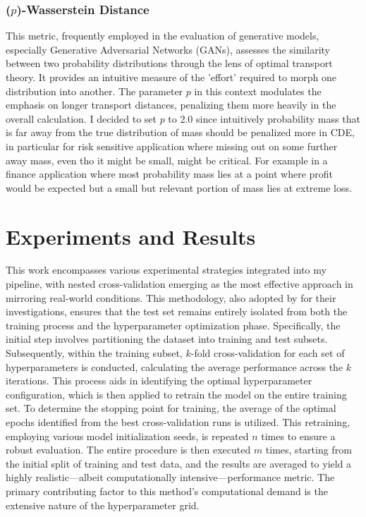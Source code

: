 \documentclass{article}
\begin{document}
\subsubsection{($p$)-Wasserstein Distance}
This metric, frequently employed in the evaluation of generative models, especially Generative Adversarial Networks (GANs), assesses the similarity between two probability distributions through the lens of optimal transport theory. It provides an intuitive measure of the 'effort' required to morph one distribution into another. The parameter $p$ in this context modulates the emphasis on longer transport distances, penalizing them more heavily in the overall calculation. I decided to set $p$ to 2.0 since intuitively probability mass that is far away from the true distribution of mass should be penalized more in CDE, in particular for risk sensitive application where missing out on some further away mass, even tho it might be small, might be critical. For example in a finance application where most probability mass lies at a point where profit would be expected but a small but relevant portion of mass lies at extreme loss.

\section{Experiments and Results}\label{sec:experiments_and_results}
This work encompasses various experimental strategies integrated into my pipeline, with nested cross-validation emerging as the most effective approach in mirroring real-world conditions. This methodology, also adopted by \citep{rothfuss2019noise} for their investigations, ensures that the test set remains entirely isolated from both the training process and the hyperparameter optimization phase. Specifically, the initial step involves partitioning the dataset into training and test subsets. Subsequently, within the training subset, $k$-fold cross-validation for each set of hyperparameters is conducted, calculating the average performance across the $k$ iterations. This process aids in identifying the optimal hyperparameter configuration, which is then applied to retrain the model on the entire training set. To determine the stopping point for training, the average of the optimal epochs identified from the best cross-validation runs is utilized. This retraining, employing various model initialization seeds, is repeated $n$ times to ensure a robust evaluation. The entire procedure is then executed $m$ times, starting from the initial split of training and test data, and the results are averaged to yield a highly realistic—albeit computationally intensive—performance metric. The primary contributing factor to this method's computational demand is the extensive nature of the hyperparameter grid.
\end{document}
